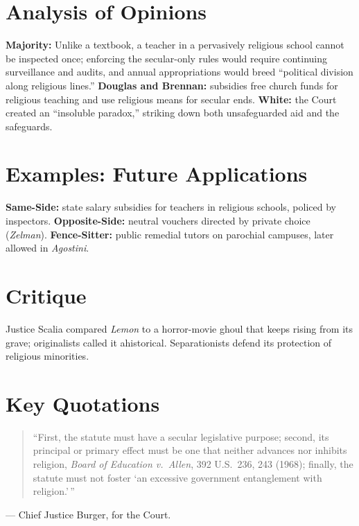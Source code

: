 \documentclass[12pt]{article}
\begin{document}
\section{Analysis of Opinions}
\textbf{Majority:} Unlike a textbook, a teacher in a pervasively religious school cannot be inspected once; enforcing the secular-only rules would require continuing surveillance and audits, and annual appropriations would breed ``political division along religious lines.'' \textbf{Douglas and Brennan:} subsidies free church funds for religious teaching and use religious means for secular ends. \textbf{White:} the Court created an ``insoluble paradox,'' striking down both unsafeguarded aid and the safeguards.

\section{Examples: Future Applications}
\textbf{Same-Side:} state salary subsidies for teachers in religious schools, policed by inspectors. \textbf{Opposite-Side:} neutral vouchers directed by private choice (\textit{Zelman}). \textbf{Fence-Sitter:} public remedial tutors on parochial campuses, later allowed in \textit{Agostini}.

\section{Critique}
Justice Scalia compared \textit{Lemon} to a horror-movie ghoul that keeps rising from its grave; originalists called it ahistorical. Separationists defend its protection of religious minorities.

\section{Key Quotations}
\begin{quote}\sloppy
``First, the statute must have a secular legislative purpose; second, its principal or primary effect must be one that neither advances nor inhibits religion, \textit{Board of Education v.\ Allen}, 392 U.S.\ 236, 243 (1968); finally, the statute must not foster `an excessive government entanglement with religion.'\,''
\end{quote}
\noindent --- Chief Justice Burger, for the Court.
\end{document}

